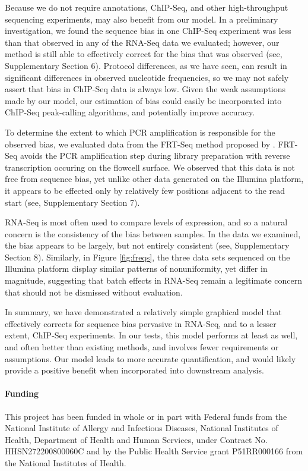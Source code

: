 \documentclass{bioinfo}
\begin{document}
Because we do not require annotations, ChIP-Seq, and other high-throughput
sequencing experiments, may also benefit from our model. In a preliminary
investigation, we found the sequence bias in one ChIP-Seq experiment
\cite{Cao2010} was less than that observed in any of the RNA-Seq data we
evaluated; however, our method is still able to effectively correct for the bias
that was observed (see, Supplementary Section 6).  Protocol differences, as we
have seen, can result in significant differences in observed nucleotide
frequencies, so we may not safely assert that bias in ChIP-Seq data is always
low.  Given the weak assumptions made by our model, our estimation of bias could
easily be incorporated into ChIP-Seq peak-calling algorithms, and potentially
improve accuracy.

To determine the extent to which PCR amplification is responsible for the
observed bias, we evaluated data from the FRT-Seq method proposed by
\citet{Mamanova2010}.  FRT-Seq avoids the PCR amplification step during library
preparation with reverse transcription occuring on the flowcell surface. We
observed that this data is not free from sequence bias, yet unlike other data
generated on the Illumina platform, it appears to be effected only by relatively
few positions adjacent to the read start (see, Supplementary Section 7).

RNA-Seq is most often used to compare levels of expression, and so a natural
concern is the consistency of the bias between samples. In the data we examined,
the bias appears to be largely, but not entirely consistent (see, Supplementary
Section 8).  Similarly, in Figure \ref{fig:freqs}, the three data sets sequenced
on the Illumina platform display similar patterns of nonuniformity, yet differ
in magnitude, suggesting that batch effects in RNA-Seq remain a legitimate
concern that should not be dismissed without evaluation.

In summary, we have demonstrated a relatively simple graphical model that
effectively corrects for sequence bias pervasive in RNA-Seq, and to a lesser
extent, ChIP-Seq experiments. In our tests, this model performs at least as
well, and often better than existing methods, and involves fewer requirements or
assumptions. Our model leads to more accurate quantification, and would likely
provide a positive benefit when incorporated into downstream analysis.


\paragraph{Funding\textcolon} This project has been funded in whole or in part
with Federal funds from the National Institute of Allergy and Infectious
Diseases, National Institutes of Health, Department of Health and Human Services,
under Contract No.  HHSN272200800060C and by the Public Health Service grant
P51RR000166 from the National Institutes of Health.





\end{document}
